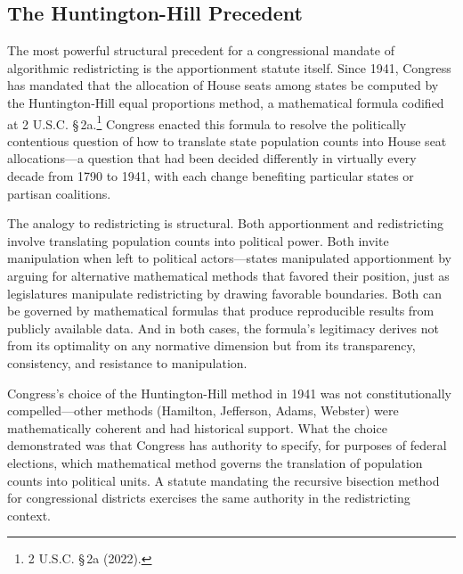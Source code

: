 \subsection{The Huntington-Hill Precedent}

The most powerful structural precedent for a congressional mandate of algorithmic redistricting is the apportionment statute itself. Since 1941, Congress has mandated that the allocation of House seats among states be computed by the Huntington-Hill equal proportions method, a mathematical formula codified at 2 U.S.C. \S\,2a.\footnote{2 U.S.C. \S\,2a (2022).} Congress enacted this formula to resolve the politically contentious question of how to translate state population counts into House seat allocations---a question that had been decided differently in virtually every decade from 1790 to 1941, with each change benefiting particular states or partisan coalitions.

The analogy to redistricting is structural. Both apportionment and redistricting involve translating population counts into political power. Both invite manipulation when left to political actors---states manipulated apportionment by arguing for alternative mathematical methods that favored their position, just as legislatures manipulate redistricting by drawing favorable boundaries. Both can be governed by mathematical formulas that produce reproducible results from publicly available data. And in both cases, the formula's legitimacy derives not from its optimality on any normative dimension but from its transparency, consistency, and resistance to manipulation.

Congress's choice of the Huntington-Hill method in 1941 was not constitutionally compelled---other methods (Hamilton, Jefferson, Adams, Webster) were mathematically coherent and had historical support. What the choice demonstrated was that Congress has authority to specify, for purposes of federal elections, which mathematical method governs the translation of population counts into political units. A statute mandating the recursive bisection method for congressional districts exercises the same authority in the redistricting context.
